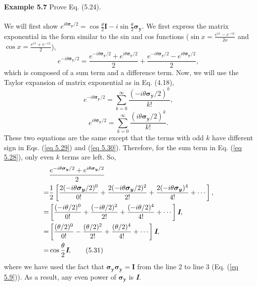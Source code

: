 \documentclass{article}
\newcommand{\bfit}[1]{\textit{\textbf{#1}}}
\begin{document}
\textbf{Example 5.7} Prove Eq. (5.24).\\\\
We will first show $e^{i\theta\boldsymbol{\sigma_y}/2}=\cos{\frac{\theta}{2}}\boldsymbol{I}-i\sin{\frac{\theta}{2}}\boldsymbol{\sigma_y}$.
We first express the matrix exponential in the form similar to the sin and cos functions ($\sin{x}=\frac{e^{ix}-e^{-ix}}{2o}$ and
$\cos{x}=\frac{e^{ix}+e^{-ix}}{2}$),
\begin{equation}\label{eq 5.28}
    e^{-i\theta\boldsymbol{\sigma_y}/2}=\frac{e^{-i\theta\boldsymbol{\sigma_y}/2}+e^{i\theta\boldsymbol{\sigma_y}/2}}{2}+
    \frac{e^{-i\theta\boldsymbol{\sigma_y}/2}-e^{i\theta\boldsymbol{\sigma_y}/2}}{2}, \tag{5.28}
\end{equation}
which is composed of a sum term and a difference term. Now, we will use the Taylor
expansion of matrix exponential as in Eq. (4.18),
\begin{equation}\label{eq 5.29}
    e^{-i\theta\boldsymbol{\sigma_y}/2}=\sum_{k=0}^{\infty}\frac{(-i\theta\boldsymbol{\sigma_y}/2)^k}{k!},\tag{5.29}
\end{equation}
\begin{equation}\label{eq 5.30}
     e^{i\theta\boldsymbol{\sigma_y}/2}=\sum_{k=0}^{\infty}\frac{(i\theta\boldsymbol{\sigma_y}/2)^k}{k!}.\tag{5.30}
\end{equation}
These two equations are the same except that the terms with odd $k$ have different
sign in Eqs. (\ref{eq 5.29}) and (\ref{eq 5.30}). Therefore, for the sum term in Eq. (\ref{eq 5.28}),
only even $k$ terms are left. So,
\begin{align*}\label{eq 5.31}
    &\frac{e^{-i\theta\boldsymbol{\sigma_y}/2}+e^{i\theta\boldsymbol{\sigma_y}/2}}{2}\\
    =&\frac{1}{2}\left[ \frac{2(-i\theta\boldsymbol{\sigma_y}/2)^0}{0!}+\frac{2(-i\theta\boldsymbol{\sigma_y}/2)^2}{2!}+\frac{2(-i\theta\boldsymbol{\sigma_y})^4}{4!}+\cdots \right], \\
    =&\left[\frac{(-i\theta/2)^0}{0!}+\frac{(-i\theta/2)^2}{2!}+\frac{(-i\theta/2)^4}{4!}+\cdots\right]\bfit{I},\\
    =&\left[\frac{(\theta/2)^0}{0!}-\frac{(\theta/2)^2}{2!}+\frac{(\theta/2)^4}{4!}+\cdots\right]\bfit{I},\\
    =&\cos{\frac{\theta}{2}}\bfit{I},\tag{5.31}
\end{align*}
where we have used the fact that $\boldsymbol{\sigma_y\sigma_y}=\boldsymbol{I}$ from the line 2 to line 3 (Eq. (\ref{eq 5.9})).
As a result, any even power of $\boldsymbol{\sigma_y}$ is \bfit{I}.
\end{document}
